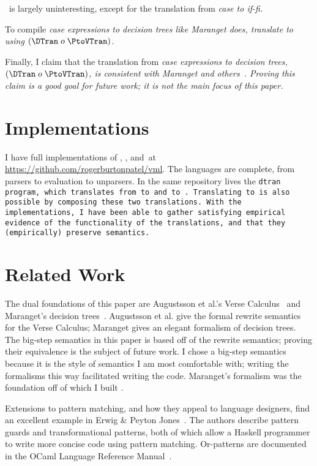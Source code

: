 \documentclass[manuscript,screen,review, 12pt, nonacm]{acmart}
\begin{document}
    \PtoVTran\ is largely uninteresting, except for the translation from
    \it{case} to \it{if-fi}.
        
    To compile \it{case} expressions to decision trees like Maranget does,
    translate \PPlus to \D using $(\DTran\; o\; \PtoVTran)$.
    
    Finally, I claim that the translation from \it{case} expressions to decision
    trees, $(\DTran\; o\; \PtoVTran)$, is consistent with Maranget and
    others~\citep{maranget,scottramsey}. Proving this claim is a good goal for
    future work; it is not the main focus of this paper. 

    \section{Implementations}

    I have full implementations of \PPlus, \VMinus, and~\D at
    \url{https://github.com/rogerburtonpatel/vml}. The languages are complete,
    from parsers to evaluation to unparsers. In the same repository lives the
    \tt{dtran} program, which translates from \PPlus to \VMinus and \VMinus to
    \D. Translating \PPlus to \D is also possible by composing these two
    translations. With the implementations, I have been able to gather
    satisfying empirical evidence of the functionality of the translations, and
    that they (empirically) preserve semantics. 


    \section{Related Work}

    The dual foundations of this paper are Augustsson et al.'s Verse
    Calculus~\citep{verse} and Maranget's decision trees~\citep{maranget}.
    Augustsson et al. give the formal rewrite semantics for the Verse Calculus;
    Maranget gives an elegant formalism of decision trees. The big-step
    semantics in this paper is based off of the rewrite semantics; proving their
    equivalence is the subject of future work. I chose a big-step semantics
    because it is the style of semantics I am most comfortable with; writing the
    formalisms this way facilitated writing the code. Maranget's formalism was
    the foundation off of which I built \D. 
    
    Extensions to pattern matching, and how they appeal to language designers,
    find an excellent example in Erwig \& Peyton Jones~\citep{guardproposal}.
    The authors describe pattern guards and transformational patterns, both of
    which allow a Haskell programmer to write more concise code using pattern
    matching. Or-patterns are documented in the OCaml Language Reference
    Manual~\citep{ocaml}.
    
\end{document}
